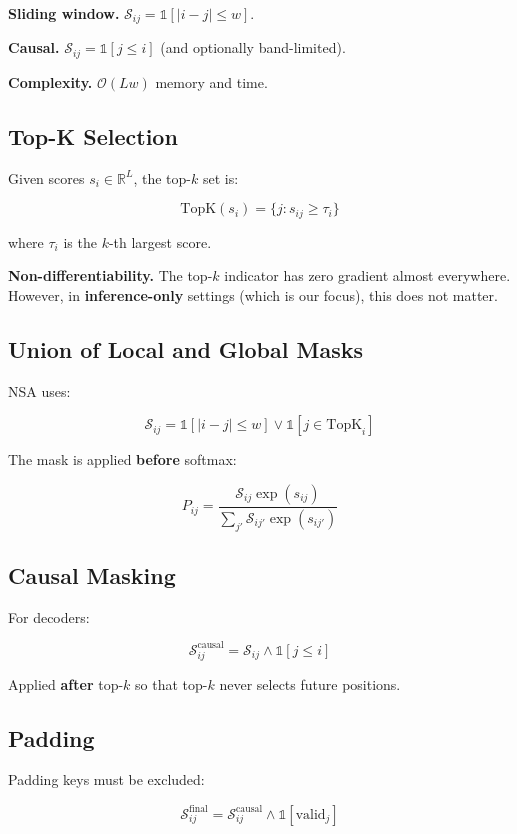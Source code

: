 \textbf{Sliding window.} $\mathcal{S}_{ij} = \mathbb{1}[|i - j| \leq w]$.

\textbf{Causal.} $\mathcal{S}_{ij} = \mathbb{1}[j \leq i]$ (and optionally band-limited).

\textbf{Complexity.} $\mathcal{O}(L w)$ memory and time.

\subsection{Top-K Selection}

Given scores $s_i \in \mathbb{R}^L$, the top-$k$ set is:

\[
\text{TopK}(s_i) = \{j : s_{ij} \geq \tau_i\}
\tag{3.3}
\]

where $\tau_i$ is the $k$-th largest score.

\textbf{Non-differentiability.} The top-$k$ indicator has zero gradient almost 
everywhere. However, in \textbf{inference-only} settings (which is our focus), 
this does not matter.

\subsection{Union of Local and Global Masks}

NSA uses:

\[
\mathcal{S}_{ij} = \mathbb{1}[|i - j| \leq w] \lor \mathbb{1}[j \in \text{TopK}_i]
\tag{3.4}
\]

The mask is applied \textbf{before} softmax:

\[
P_{ij} = \frac{\mathcal{S}_{ij} \exp(s_{ij})}{\sum_{j'} \mathcal{S}_{ij'} \exp(s_{ij'})}
\tag{3.5}
\]

\subsection{Causal Masking}

For decoders:

\[
\mathcal{S}_{ij}^\text{causal} = \mathcal{S}_{ij} \land \mathbb{1}[j \leq i]
\tag{3.6}
\]

Applied \textbf{after} top-$k$ so that top-$k$ never selects future positions.

\subsection{Padding}

Padding keys must be excluded:

\[
\mathcal{S}_{ij}^\text{final} = \mathcal{S}_{ij}^\text{causal} \land \mathbb{1}[\text{valid}_j]
\tag{3.7}
\]

